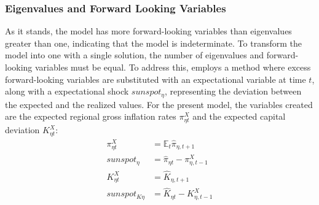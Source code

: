 \documentclass[../thesis.tex]{subfiles}
\begin{document}
\subsubsection{Eigenvalues and Forward Looking Variables}

As it stands, the model has more forward-looking variables than eigenvalues greater than one, indicating that the model is indeterminate. To transform the model into one with a single solution, the number of eigenvalues and forward-looking variables must be equal. To address this, \textcite{farmer_solving_2015} employs a method where excess forward-looking variables are substituted with an expectational variable at time $t$, along with a expectational shock $sunspot_{\eta}$, representing the deviation between the expected and the realized values. For the present model, the variables created are the expected regional gross inflation rates $\pi_{\eta t}^{X}$ and the expected capital deviation $K_{\eta t}^{X}$:
\begin{align}
	\pi_{\eta t}^{X} &= \mathbb{E}_t \hat{\pi}_{\eta, t+1} \label{eq_v2:reg-pix} \\
	sunspot_{\eta} &= \hat{\pi}_{\eta t} - \pi_{\eta, t-1}^{X} \label{eq_v2:sunspot} \\
	K_{\eta t}^{X} &= \hat{K}_{\eta, t+1} \label{eq_v2:reg-capital-x} \\
	sunspot_{K\eta} &= \hat{K}_{\eta t} - K_{\eta, t-1}^{X} \label{eq_v2:sunspot-k}
\end{align}
\end{document}
